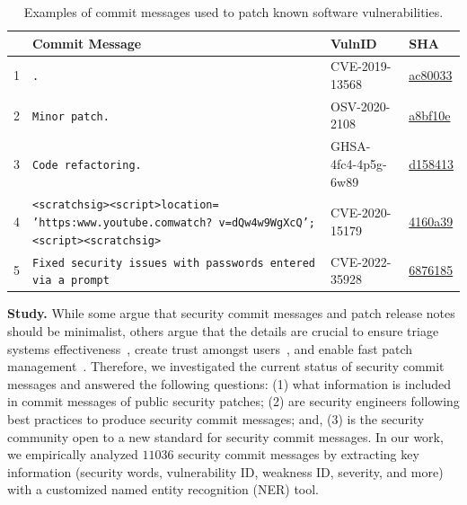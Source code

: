 \begin{table}[!t]
    \footnotesize
    \centering
    \begin{tabular}{ | p{0.01cm} | p{4.8cm} | p{1.5cm} | p{0.9cm} |} 
    \hline
     & \textbf{Commit Message} & \textbf{VulnID} & \textbf{SHA}\\\hline
        1 & \texttt{.} & CVE-2019-13568 & \href{https://github.com/GreycLab/CImg/commit/ac8003393569aba51048c9d67e1491559877b1d1}{ac80033} \\\hline
        2 & \texttt{Minor patch.} & OSV-2020-2108 & \href{https://github.com/simdjson/simdjson/commit/a8bf10ea5a0ea2553f07ac46744666c94d0085fc}{a8bf10e} \\\hline
        3 & \texttt{Code refactoring.} & GHSA-4fc4-4p5g-6w89 & \href{https://github.com/ckeditor/ckeditor4/commit/d158413449692d920a778503502dcb22881bc949}{d158413} \\\hline
        4 & \texttt{<scratchsig><script>location=
        'https:\/\/www.youtube.com\/watch?
        v=dQw4w9WgXcQ';<\/script><\/scratchsig>} & CVE-2020-15179 & \href{https://github.com//InternationalScratchWiki//wiki-scratchsig//commit//4160a39a20eebeb63a59eb7597a91b961eca6388}{4160a39} \\\hline
        5 & \texttt{Fixed security issues with passwords entered via a prompt} & CVE-2022-35928 & \href{https://github.com/paulej/AESCrypt/commit/68761851b595e96c68c3f46bfc21167e72c6a22c}{6876185} \\
    \hline
    \end{tabular}
    \caption{Examples of commit messages used to patch known software vulnerabilities.}
    \label{tab:messages}
\end{table}


\textbf{Study.} While some argue that security commit messages and patch release notes should be minimalist, others argue that the details are crucial to ensure triage systems effectiveness~\cite{SSPatcher2022,Zhang2021AnIO}, create trust amongst users~\cite{Householder2020}, and enable fast patch management~\cite{Zhang2021AnIO,Householder2020}. Therefore, we investigated the current status of security commit messages and answered the following questions: (1) what information is included in commit messages of public security patches; (2) are security engineers following best practices to produce security commit messages; and, 
(3) is the security community open to a new
standard for security commit messages.
In our work, we empirically analyzed $11036$ security commit messages by extracting key information (security words, vulnerability ID, weakness ID, severity, and more) with a customized named entity recognition (NER) tool.

